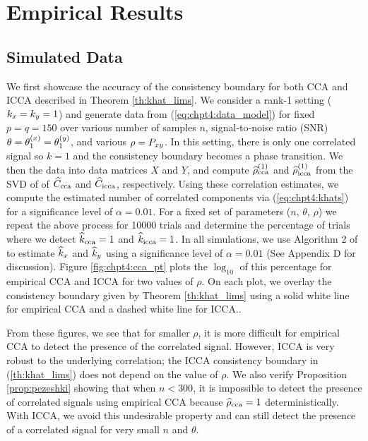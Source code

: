 \section{Empirical Results}\label{sec:chpt4:emp}

\subsection{Simulated Data}

We first showcase the accuracy of the consistency boundary for both CCA and ICCA described
in Theorem \ref{th:khat_lims}. We consider a rank-1 setting ($k_x=k_y=1$) and generate
data from (\ref{eq:chpt4:data_model}) for fixed $p=q=150$ over various number of samples
$n$, signal-to-noise ratio (SNR) $\theta=\theta^{(x)}_1=\theta^{(y)}_1$, and various $\rho=P_{xy}$. In this
setting, there is only one correlated signal so $k=1$ and the consistency boundary becomes
a phase transition. We then the data into data matrices $X$ and $Y$, and compute
$\widehat{\rho}_\text{cca}^{(1)}$ and $\widehat{\rho}_\text{icca}^{(1)}$ from the SVD of of $\widehat{C}_{\text{cca}}$ and $\widehat{C}_{\text{icca}}$,
respectively. Using these correlation estimates, we compute the estimated number of
correlated components via (\ref{eq:chpt4:khats}) for a significance level of
$\alpha=0.01$. For a fixed set of parameters ($n$, $\theta$, $\rho$) we repeat the above
process for 10000 trials and determine the percentage of trials where we detect
$\widehat{k}_{\text{cca}}=1$ and $\widehat{k}_{\text{icca}}=1$. In all simulations, we use Algorithm 2 of
\cite{nadakuditi2010fundamental} to estimate $\widehat{k}_x$ and $\widehat{k}_y$ using a significance
level of $\alpha=0.01$ (See Appendix D for discussion). Figure \ref{fig:chpt4:cca_pt} plots the $\log_{10}$ of this
percentage for empirical CCA and ICCA for two values of $\rho$. On each plot, we overlay the
consistency boundary given by Theorem \ref{th:khat_lims} using a solid white line for
empirical CCA and a dashed white line for ICCA..

From these figures, we see that for smaller $\rho$, it is more difficult for empirical CCA
to detect the presence of the correlated signal. However, ICCA is very robust to the
underlying correlation; the ICCA consistency boundary in (\ref{th:khat_lims}) does not
depend on the value of $\rho$. We also verify Proposition \ref{prop:pezeshki} showing that
when $n<300$, it is impossible to detect the presence of correlated signals using
empirical CCA because $\widehat{\rho}_\text{cca}=1$ deterministically. With ICCA, we avoid this
undesirable property and can still detect the presence of a correlated signal for very
small $n$ and $\theta$.

